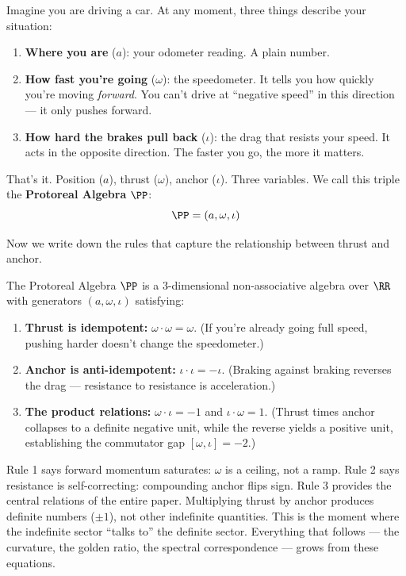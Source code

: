Imagine you are driving a car. At any moment, three things describe your situation:
\begin{enumerate}
\item \textbf{Where you are} ($a$): your odometer reading. A plain number.
\item \textbf{How fast you're going} ($\omega$): the speedometer. It tells you how quickly you're moving \emph{forward}. You can't drive at ``negative speed'' in this direction --- it only pushes forward.
\item \textbf{How hard the brakes pull back} ($\iota$): the drag that resists your speed. It acts in the opposite direction. The faster you go, the more it matters.
\end{enumerate}

That's it. Position ($a$), thrust ($\omega$), anchor ($\iota$). Three variables. We call this triple the \textbf{Protoreal Algebra} $\PP$:
$$\PP = (a, \omega, \iota)$$

Now we write down the rules that capture the relationship between thrust and anchor.

\begin{definition}\label{def:protoreal}
The Protoreal Algebra $\PP$ is a 3-dimensional non-associative algebra over $\RR$ with generators $(a, \omega, \iota)$ satisfying:
\begin{enumerate}
\item \textbf{Thrust is idempotent:} $\omega \cdot \omega = \omega$. (If you're already going full speed, pushing harder doesn't change the speedometer.)
\item \textbf{Anchor is anti-idempotent:} $\iota \cdot \iota = -\iota$. (Braking against braking reverses the drag --- resistance to resistance is acceleration.)
\item \textbf{The product relations:} $\omega \cdot \iota = -1$ and $\iota \cdot \omega = 1$. (Thrust times anchor collapses to a definite negative unit, while the reverse yields a positive unit, establishing the commutator gap $[\omega, \iota] = -2$.)
\end{enumerate}
\end{definition}

\begin{remark}
Rule 1 says forward momentum saturates: $\omega$ is a ceiling, not a ramp. Rule 2 says resistance is self-correcting: compounding anchor flips sign. Rule 3 provides the central relations of the entire paper. Multiplying thrust by anchor produces definite numbers ($\pm 1$), not other indefinite quantities. This is the moment where the indefinite sector ``talks to'' the definite sector. Everything that follows --- the curvature, the golden ratio, the spectral correspondence --- grows from these equations.
\end{remark}

